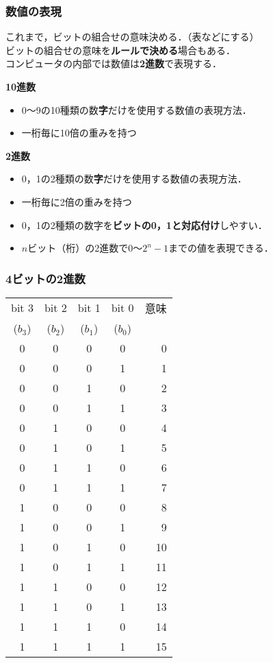 \documentclass{beamer}                 %
\begin{document}
\begin{frame}
  \frametitle{数値の表現}
  これまで，ビットの組合せの意味決める．（表などにする） \\
  ビットの組合せの意味を{\bf ルールで決める}場合もある．\\
  コンピュータの内部では数値は{\bf 2進数}で表現する．

  {\bf 10進数} \\
  \begin{itemize}
    \item 0〜9の10種類の数{\bf 字}だけを使用する数値の表現方法．
    \item 一桁毎に10倍の重みを持つ
  \end{itemize}

  {\bf 2進数} \\
  \begin{itemize}
    \item 0，1の2種類の数{\bf 字}だけを使用する数値の表現方法．
    \item 一桁毎に2倍の重みを持つ
    \item 0，1の2種類の数字を{\bf ビットの0，1と対応付け}しやすい．
    \item $n$ビット（桁）の2進数で$0$〜$2^n-1$までの値を表現できる．
  \end{itemize}

\end{frame}

\begin{frame}
  \frametitle{4ビットの2進数}
  \begin{center}
    {\small\begin{tabular}{c|c|c|c|r}
      \hline\hline
      bit 3 & bit 2 & bit 1 & bit 0 & 意味\\
      ($b_3$)&($b_2$)&($b_1$)&($b_0$)&\\
      \hline
      0 &  0 &  0 &  0 &  0 \\
      0 &  0 &  0 &  1 &  1 \\
      0 &  0 &  1 &  0 &  2 \\
      0 &  0 &  1 &  1 &  3 \\
      0 &  1 &  0 &  0 &  4 \\
      0 &  1 &  0 &  1 &  5 \\
      0 &  1 &  1 &  0 &  6 \\
      0 &  1 &  1 &  1 &  7 \\
      1 &  0 &  0 &  0 &  8 \\
      1 &  0 &  0 &  1 &  9 \\
      1 &  0 &  1 &  0 & 10 \\
      1 &  0 &  1 &  1 & 11 \\
      1 &  1 &  0 &  0 & 12 \\
      1 &  1 &  0 &  1 & 13 \\
      1 &  1 &  1 &  0 & 14 \\
      1 &  1 &  1 &  1 & 15 \\
    \end{tabular}}
  \end{center}
\end{frame}
\end{document}
